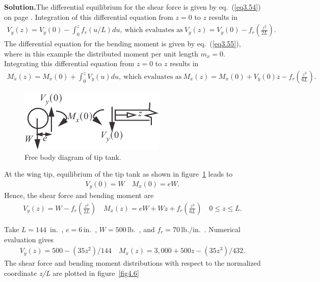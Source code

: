 \documentclass{AeroStructure-ERJohnson}
\begin{document}
\begin{example}
\noindent\textbf{Solution.}\enspace The differential equilibrium for the shear force is given by eq.~(\ref{eq3.54}) on page \pageref{eq3.54}. Integration of this differential equation from $z =0$ to $z$ results in
\begin{align}\label{ex4.1a}
V_{y}(z)=V_{y}(0)-\int_{0}^{z} f_{r}(u/L) d u,\ \text{which evaluates as}\ V_{y}(z)=V_{y}(0)-f_{r}\left(\frac{z^{2}}{2 L}\right).
\end{align}
The differential equation for the bending moment is given by eq.~(\ref{eq3.55}), where in this example the distributed moment per unit length $m_{x}=0$. Integrating this differential equation from $z =0$ to $z$ results in
\begin{align}\label{ex4.1b}
M_{x}(z)=M_{x}(0)+\int_{0}^{z} V_{y}(u) d u,\ \text{which evaluates as}\ M_{x}(z)=M_{x}(0)+V_{y}(0) z-f_{r}\left(\frac{z^{3}}{6 L}\right).
\end{align}
\begin{figure}
\vspace{-16pt}
\includegraphics{Figure_4-5.pdf}
\caption{Free body diagram of tip tank\vspace*{10pt}.\label{fig4.5}}
\end{figure}
 At the wing tip, equilibrium of the tip tank as shown in figure~\ref{fig4.5} leads to
\begin{align}\label{ex4.1c}
V_{y}(0)=W \quad M_{x}(0)=e W.
\end{align}
Hence, the shear force and bending moment are
\begin{align}\label{ex4.1d}
V_{y}(z)=W-f_{r}\left(\frac{z^{2}}{2 L}\right) \quad M_{x}(z)=e W+W z+f_{r}\left(\frac{z^{3}}{6 L}\right) \quad 0 \leq z \leq L.
\end{align}
\vspace*{5pt}
\clearpage

\noindent Take $L=144$~in.~, $e=6\,\textrm{in}.$~, $W=500\,\textrm{lb.}$~, and $f_{r}=70\,\textrm{lb}./\mathrm{in.}$~. Numerical evaluation gives
\begin{align}\label{ex4.1e}
V_{y}(z)=500-(35 z^{2})/144 \quad M_{x}(z)=3,000+500 z-(35 z^{3})/432.
\end{align}
The shear force and bending moment distributions with respect to the normalized coordinate \textit{z/L} are plotted in figure~\ref{fig4.6}


\end{example}
\end{document}
